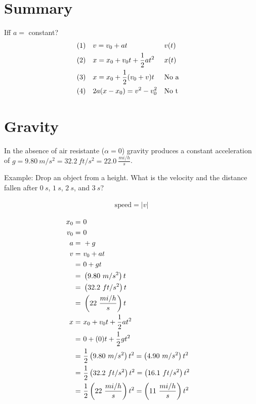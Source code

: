 \section{Summary}
	Iff $a = $ constant?
	\begin{align}
		&(1)& &v = v_{0} + at& &v(t)& \notag \\
		&(2)& &x = x_{0} + v_{0}t + \frac{1}{2}at^{2}& &x(t)& \notag \\
		&(3)& &x = x_{0} + \frac{1}{2}(v_{0}+v)t& &\text{No a}& \notag \\
		&(4)& &2a(x-x_{0}) = v^{2} - v_{0}^{2}& &\text{No t}& \notag
	\end{align}

\section{Gravity}
	In the absence of air resistante ($\alpha = 0$) gravity produces a constant acceleration of $g = 9.80 \ m/s^{2} = 32.2 \ ft/s^{2} = 22.0 \ \frac{mi/h}{s}$.

	Example: Drop an object from a height. What is the velocity and the distance fallen after $0 \ s$, $1 \ s$, $2 \ s$, and $3 \ s$?

	\begin{align}
		\text{speed} = |v|
	\end{align}

	\begin{align}
		x_{0} = \ &0& \notag \\
		v_{0} = \ &0& \notag \\
		a = \ &+g& \notag \\
		v = \ &v_{0} + at& \notag \\
		= \ &0 + gt& \notag \\
		= \ &\left(9.80 \ m/s^{2}\right)t& \notag \\
		= \ &\left(32.2 \ ft/s^{2}\right)t& \notag \\
		= \ &\left(22 \ \frac{mi/h}{s}\right)t& \notag \\
		x = \ &x_{0} + v_{0}t+ \frac{1}{2}at^{2}& \notag \\
		= \ &0 + (0)t+ \frac{1}{2}gt^{2}& \notag \\
		= \ &\frac{1}{2}\left(9.80 \ m/s^{2}\right)t^{2} = \left(4.90 \ m/s^{2}\right)t^{2}& \notag \\
		= \ &\frac{1}{2}\left(32.2 \ ft/s^{2}\right)t^{2} = \left(16.1 \ ft/s^{2}\right)t^{2}& \notag \\
		= \ &\frac{1}{2} \left( 22 \ \frac{mi/h}{s} \right) t^{2} = \left(11 \ \frac{mi/h}{s} \right) t^{2}& \notag
	\end{align}

